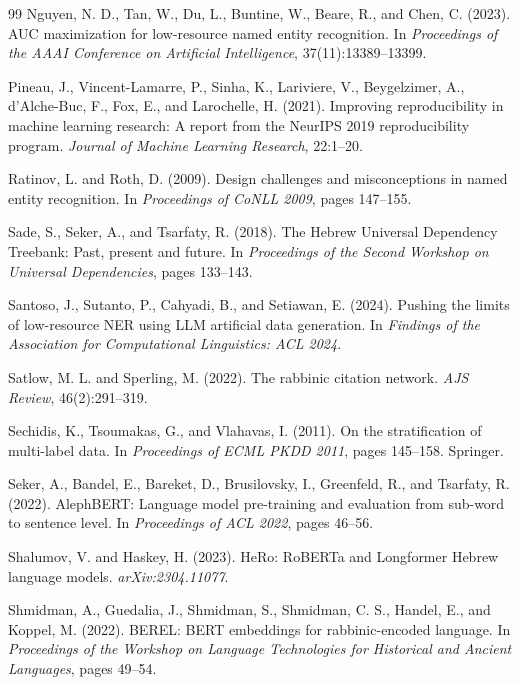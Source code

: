 \documentclass[12pt,a4paper]{report}
\begin{document}
\begin{thebibliography}{99}
Nguyen, N. D., Tan, W., Du, L., Buntine, W., Beare, R., and Chen, C. (2023).
AUC maximization for low-resource named entity recognition.
In \emph{Proceedings of the AAAI Conference on Artificial Intelligence}, 37(11):13389--13399.

Pineau, J., Vincent-Lamarre, P., Sinha, K., Lariviere, V., Beygelzimer, A., d'Alche-Buc, F., Fox, E., and Larochelle, H. (2021).
Improving reproducibility in machine learning research: A report from the NeurIPS 2019 reproducibility program.
\emph{Journal of Machine Learning Research}, 22:1--20.

Ratinov, L. and Roth, D. (2009).
Design challenges and misconceptions in named entity recognition.
In \emph{Proceedings of CoNLL 2009}, pages 147--155.

Sade, S., Seker, A., and Tsarfaty, R. (2018).
The Hebrew Universal Dependency Treebank: Past, present and future.
In \emph{Proceedings of the Second Workshop on Universal Dependencies}, pages 133--143.

Santoso, J., Sutanto, P., Cahyadi, B., and Setiawan, E. (2024).
Pushing the limits of low-resource NER using LLM artificial data generation.
In \emph{Findings of the Association for Computational Linguistics: ACL 2024}.

Satlow, M. L. and Sperling, M. (2022).
The rabbinic citation network.
\emph{AJS Review}, 46(2):291--319.

Sechidis, K., Tsoumakas, G., and Vlahavas, I. (2011).
On the stratification of multi-label data.
In \emph{Proceedings of ECML PKDD 2011}, pages 145--158. Springer.

Seker, A., Bandel, E., Bareket, D., Brusilovsky, I., Greenfeld, R., and Tsarfaty, R. (2022).
AlephBERT: Language model pre-training and evaluation from sub-word to sentence level.
In \emph{Proceedings of ACL 2022}, pages 46--56.

Shalumov, V. and Haskey, H. (2023).
HeRo: RoBERTa and Longformer Hebrew language models.
\emph{arXiv:2304.11077}.

Shmidman, A., Guedalia, J., Shmidman, S., Shmidman, C. S., Handel, E., and Koppel, M. (2022).
BEREL: BERT embeddings for rabbinic-encoded language.
In \emph{Proceedings of the Workshop on Language Technologies for Historical and Ancient Languages}, pages 49--54.


\end{thebibliography}
\end{document}
